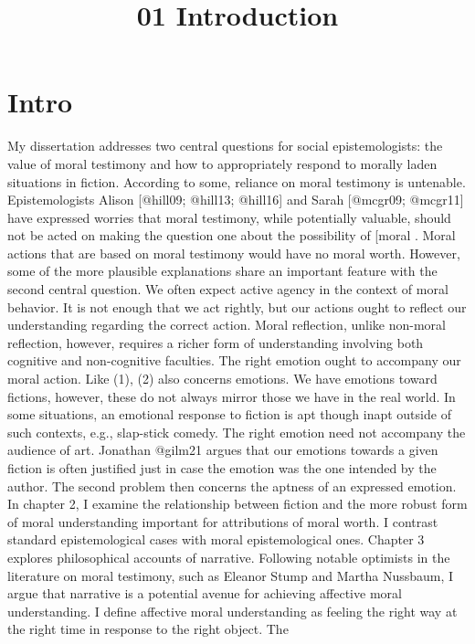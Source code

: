 \documentclass[
  letterpaper,
  DIV=11,
  numbers=noendperiod]{scrartcl}
\title{01 Introduction}
\author{}
\date{}
\theoremstyle{remark}
\begin{document}
\maketitle


\section{Intro}\label{intro}

My dissertation addresses two central questions for social
epistemologists: the value of moral testimony and how to appropriately
respond to morally laden situations in fiction. According to some,
reliance on moral testimony is untenable. Epistemologists Alison
{[}@hill09; @hill13; @hill16{]} and Sarah {[}@mcgr09; @mcgr11{]} have
expressed worries that moral testimony, while potentially valuable,
should not be acted on making the question one about the possibility of
{[}moral . Moral actions that are based on moral testimony would have no
moral worth. However, some of the more plausible explanations share an
important feature with the second central question. We often expect
active agency in the context of moral behavior. It is not enough that we
act rightly, but our actions ought to reflect our understanding
regarding the correct action. Moral reflection, unlike non-moral
reflection, however, requires a richer form of understanding involving
both cognitive and non-cognitive faculties. The right emotion ought to
accompany our moral action. Like (1), (2) also concerns emotions. We
have emotions toward fictions, however, these do not always mirror those
we have in the real world. In some situations, an emotional response to
fiction is apt though inapt outside of such contexts, e.g., slap-stick
comedy. The right emotion need not accompany the audience of art.
Jonathan @gilm21 argues that our emotions towards a given fiction is
often justified just in case the emotion was the one intended by the
author. The second problem then concerns the aptness of an expressed
emotion. In chapter 2, I examine the relationship between fiction and
the more robust form of moral understanding important for attributions
of moral worth. I contrast standard epistemological cases with moral
epistemological ones. Chapter 3 explores philosophical accounts of
narrative. Following notable optimists in the literature on moral
testimony, such as Eleanor Stump and Martha Nussbaum, I argue that
narrative is a potential avenue for achieving affective moral
understanding. I define affective moral understanding as feeling the
right way at the right time in response to the right object. The
\end{document}
